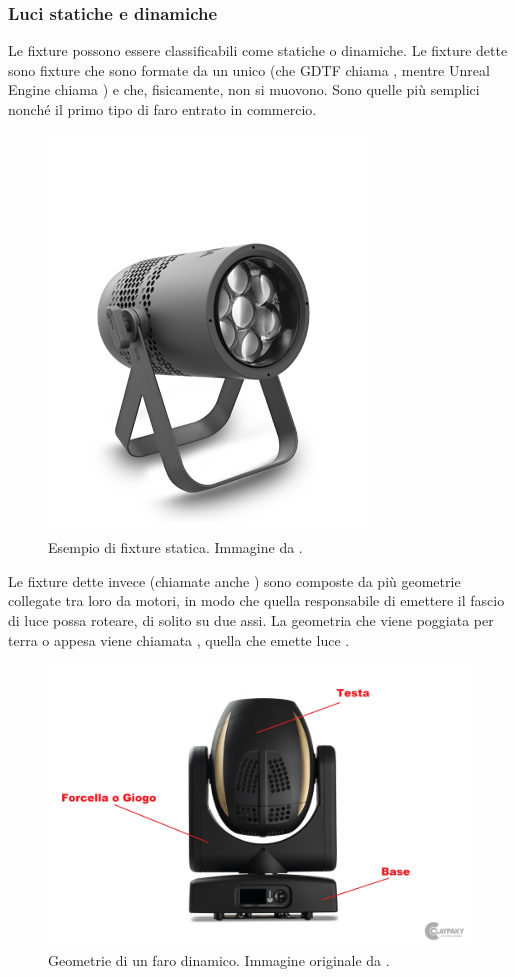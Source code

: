 \documentclass[main.tex]{subfiles}
\begin{document}
\subsubsection{Luci statiche e dinamiche}\label{subsec:1_1_fixtureTypes}
Le fixture possono essere classificabili come statiche o dinamiche. Le fixture dette  sono fixture che sono formate da un unico  (che GDTF chiama , mentre Unreal Engine chiama ) e che, fisicamente, non si muovono. Sono quelle più semplici nonché il primo tipo di faro entrato in commercio.
\begin{figure}[H]
    \centering
    \includegraphics[width=0.4\linewidth]{img/introduzione/staticFixtureExample.jpg}
    \caption{Esempio di fixture statica. Immagine da \cite{fig_1_fixtureStatic}.}
    \label{fig:1_staticFixture}
\end{figure}
\noindent Le fixture dette invece  (chiamate anche ) sono composte da più geometrie collegate tra loro da motori, in modo che quella responsabile di emettere il fascio di luce possa roteare, di solito su due assi. La geometria che viene poggiata per terra o appesa viene chiamata , quella che emette luce .
\begin{figure}[H]
    \centering
    \includegraphics[width=0.75\linewidth]{img/introduzione/dynamicFixtureAnatomy.jpg}
    \caption{Geometrie di un faro dinamico. Immagine originale da \cite{fig_1_xtylos}.}
    \label{fig:1_DynamicFixture}
\end{figure}
\end{document}
